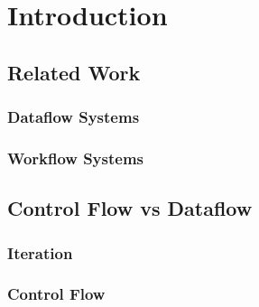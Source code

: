 \chapter{Introduction}

\section{Related Work}

\subsection{Dataflow Systems}

\subsection{Workflow Systems}

\section{Control Flow vs Dataflow}\label{ch1:opts}

\subsection{Iteration}

\subsection{Control Flow}